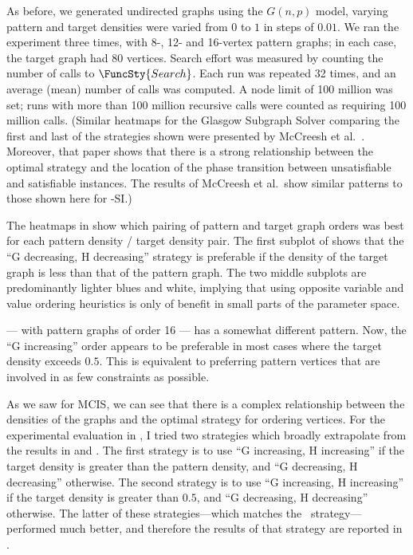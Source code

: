 As before, we generated
undirected graphs using the $G(n,p)$ model, varying pattern and target
densities were varied from $0$ to $1$ in steps of $0.01$.
We ran the experiment three times,
with 8-, 12- and 16-vertex pattern graphs; in each case, the target graph had 80 vertices.
Search effort was measured by counting the number of calls to $\FuncSty{Search}$.
Each run was repeated 32 times, and an average (mean) number of calls was computed.
A node limit of 100 million was set; runs with more than 100 million recursive calls
were counted as requiring 100 million calls.
(Similar heatmaps for the Glasgow Subgraph Solver comparing the first and last of the strategies shown were
presented by McCreesh et al.\ \cite{DBLP:journals/jair/McCreeshPST18}.  Moreover,
that paper shows that there is a strong relationship between the optimal strategy
and the location of the phase transition between unsatisfiable and satisfiable
instances.
The results of McCreesh et al.\ show similar patterns to those shown here for \McSplit-SI.)

The heatmaps in  show which pairing of pattern and target
graph orders was best for each pattern density / target density pair.
The first subplot of
shows that the ``G decreasing, H decreasing'' strategy is
preferable if the density of the target graph is less than that of the pattern graph.
The two middle subplots are predominantly lighter blues and white, implying that
using opposite variable and value ordering heuristics is only of benefit in small
parts of the parameter space.

 --- with pattern graphs of order 16 --- has a somewhat different
pattern.  Now, the ``G increasing'' order
appears to be preferable in most cases where the target density exceeds $0.5$.  This is equivalent
to preferring pattern vertices that are involved in as few constraints as possible.

As we saw for MCIS, we can see that there is a complex relationship between
the densities of the graphs and the optimal strategy for ordering vertices.
For the experimental evaluation in , I tried two 
strategies which broadly extrapolate from the results in
 and
.  The first strategy is to use ``G increasing, H increasing''
if the target density is greater than the pattern density, and ``G decreasing, H decreasing''
otherwise.  The second strategy is to use ``G increasing, H increasing'' if the target
density is greater than $0.5$, and ``G decreasing, H decreasing'' otherwise.
The latter of these strategies---which matches the \McSplit\ strategy---performed
much better, and therefore the results of that strategy
are reported in .

